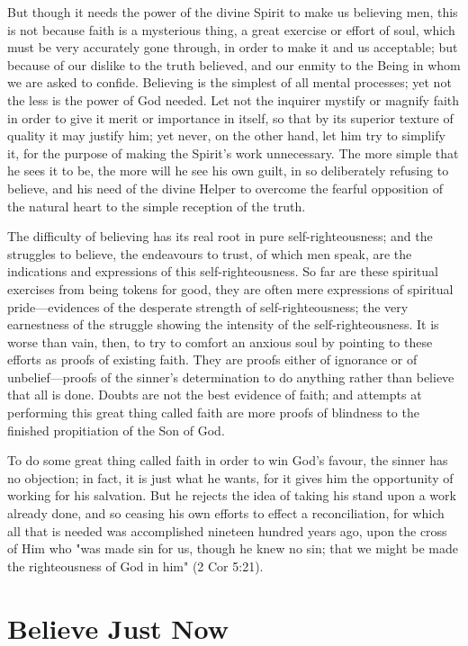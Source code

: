 \documentclass[
]{book}
\begin{document}
But though it needs the power of the divine Spirit to make us believing men, this is not because faith is a mysterious thing, a great exercise or effort of soul, which must be very accurately gone through, in order to make it and us acceptable; but because of our dislike to the truth believed, and our enmity to the Being in whom we are asked to confide. Believing is the simplest of all mental processes; yet not the less is the power of God needed. Let not the inquirer mystify or magnify faith in order to give it merit or importance in itself, so that by its superior texture of quality it may justify him; yet never, on the other hand, let him try to simplify it, for the purpose of making the Spirit's work unnecessary. The more simple that he sees it to be, the more will he see his own guilt, in so deliberately refusing to believe, and his need of the divine Helper to overcome the fearful opposition of the natural heart to the simple reception of the truth.

The difficulty of believing has its real root in pure self-righteousness; and the struggles to believe, the endeavours to trust, of which men speak, are the indications and expressions of this self-righteousness. So far are these spiritual exercises from being tokens for good, they are often mere expressions of spiritual pride---evidences of the desperate strength of self-righteousness; the very earnestness of the struggle showing the intensity of the self-righteousness. It is worse than vain, then, to try to comfort an anxious soul by pointing to these efforts as proofs of existing faith. They are proofs either of ignorance or of unbelief---proofs of the sinner's determination to do anything rather than believe that all is done. Doubts are not the best evidence of faith; and attempts at performing this great thing called faith are more proofs of blindness to the finished propitiation of the Son of God.

To do some great thing called faith in order to win God's favour, the sinner has no objection; in fact, it is just what he wants, for it gives him the opportunity of working for his salvation. But he rejects the idea of taking his stand upon a work already done, and so ceasing his own efforts to effect a reconciliation, for which all that is needed was accomplished nineteen hundred years ago, upon the cross of Him who "was made sin for us, though he knew no sin; that we might be made the righteousness of God in him" (2 Cor 5:21).

\hypertarget{believe-just-now}{%
\chapter{Believe Just Now}\label{believe-just-now}}
\end{document}
